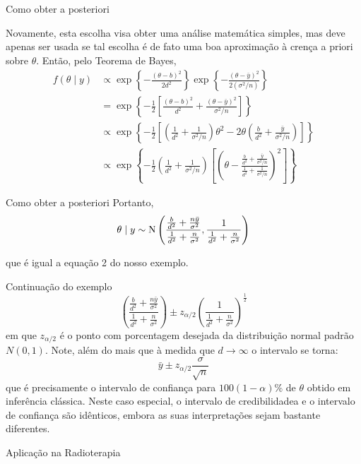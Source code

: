 \documentclass{beamer}
\theoremstyle{definition}
\begin{document}
\begin{frame}{Como obter a posteriori}
    
Novamente, esta escolha visa obter uma análise matemática simples, mas deve apenas ser usada se tal escolha é de fato uma boa aproximação à crença a priori sobre $\theta$. Então, pelo Teorema de Bayes,
$$
\begin{aligned}
f(\theta \mid y) & \propto \exp \left\{-\frac{(\theta-b)^2}{2 d^2}\right\} \exp \left\{-\frac{(\theta-\bar{y})^2}{2\left(\sigma^2 / n\right)}\right\} \\
& =\exp \left\{-\frac{1}{2}\left[\frac{(\theta-b)^2}{d^2}+\frac{(\theta-\bar{y})^2}{\sigma^2 / n}\right]\right\} \\
& \propto \exp \left\{-\frac{1}{2}\left[\left(\frac{1}{d^2}+\frac{1}{\sigma^2 / n}\right) \theta^2-2 \theta\left(\frac{b}{d^2}+\frac{\bar{y}}{\sigma^2 / n}\right)\right]\right\} \\
& \propto \exp \left\{-\frac{1}{2}\left(\frac{1}{d^2}+\frac{1}{\sigma^2 / n}\right)\left[\left(\theta-\frac{\frac{b}{d^2}+\frac{\bar{y}}{\sigma^2 / n}}{\frac{1}{d^2}+\frac{1}{\sigma^2 / n}}\right)^2\right]\right\}
\end{aligned}
$$
\end{frame}

\begin{frame}{Como obter a posteriori}
    Portanto,
    \begin{equation}
        \theta \mid y \sim \mathrm{N}\left(\frac{\frac{b}{d^2}+\frac{n \bar{y}}{\sigma^2}}{\frac{1}{d^2}+\frac{n}{\sigma^2}}, \frac{1}{\frac{1}{d^2}+\frac{n}{\sigma^2}}\right)
          \vspace{0.8cm}
    \end{equation}
  
    que é igual a equação 2 do nosso exemplo.
\end{frame}

\begin{frame}{Continuação do exemplo}
$$
\left(\frac{\frac{b}{d^2}+\frac{n \bar{y}}{\sigma^2}}{\frac{1}{d^2}+\frac{n}{\sigma^2}}\right) \pm z_{\alpha / 2}\left(\frac{1}{\frac{1}{d^2}+\frac{n}{\sigma^2}}\right)^{\frac{1}{2}}
$$
em que $z_{\alpha / 2}$ é o ponto com porcentagem desejada da distribuição normal padrão $N(0,1)$. Note, além do mais que à medida que $d \rightarrow \infty$ o intervalo se torna:
$$
\bar{y} \pm z_{\alpha / 2} \frac{\sigma}{\sqrt{n}}
$$
que é precisamente o intervalo de confiança para $100(1-\alpha) \%$ de $\theta$ obtido em inferência clássica. Neste caso especial, o intervalo de credibilidadea e o intervalo de confiança são idênticos, embora as suas interpretações sejam bastante diferentes.
\end{frame}
\begin{frame}{Aplicação na Radioterapia}
    
\end{frame}
 
\end{document}
